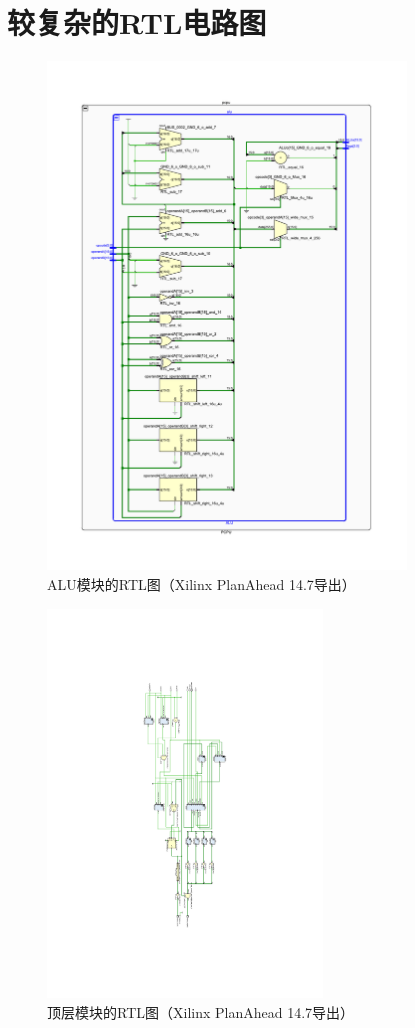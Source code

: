 \documentclass[10pt,a4paper,fleqn]{article}
\begin{document}
\section{较复杂的RTL电路图}
\begin{figure}[H]
  \centering
  \includegraphics[width=0.85\textwidth]{figure/aluex.pdf}
  \caption{ALU模块的RTL图（Xilinx PlanAhead 14.7导出）}
\end{figure}
\newpage
\thispagestyle{empty}
\begin{figure}[H]
  \centering
  \includegraphics[width=0.65\textwidth]{figure/topex.pdf}
  \caption{顶层模块的RTL图（Xilinx PlanAhead 14.7导出）}
\end{figure}
\end{document}
